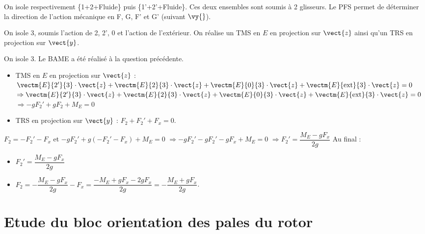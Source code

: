 \ifprof
\begin{corrige}
On isole respectivement \{1+2+Fluide\} puis \{1'+2'+Fluide\}.  Ces deux ensembles sont soumis à 2 glisseurs. Le PFS permet de déterminer la direction de l'action mécanique en F, G, F' et G' (suivant $\vy{}$).

On isole 3, soumis l'action de 2, 2', 0 et l'action de l'extérieur. On réalise un TMS en $E$ en projection sur $\vect{z}$ ainsi qu'un TRS en projection sur $\vect{y}$. 
\end{corrige}
\else
\fi

\ifprof
\begin{corrige}
On isole 3. Le BAME a été réalisé à la question précédente. 

\begin{itemize}
\item TMS en $E$ en projection sur $\vect{z}$ :
$\vectm{E}{2'}{3} \cdot \vect{z} + \vectm{E}{2}{3} \cdot \vect{z}+ \vectm{E}{0}{3} \cdot \vect{z}+ \vectm{E}{\text{ext}}{3} \cdot \vect{z} = 0$
$\Rightarrow \vectm{E}{2'}{3} \cdot \vect{z} + \vectm{E}{2}{3} \cdot \vect{z}+ \vectm{E}{0}{3} \cdot \vect{z}+ \vectm{E}{\text{ext}}{3} \cdot \vect{z} = 0$
$\Rightarrow -gF_2'+gF_2+ M_E = 0$
\item TRS en projection sur $\vect{y}$ : $F_2+F_2'+ F_x = 0$.
\end{itemize}

$F_2 = -F_2'- F_x $ et $-gF_2'+g\left( -F_2'- F_x \right)+ M_E = 0$ 
$ \Rightarrow -gF_2'-gF_2'-g F_x + M_E = 0$ 
$ \Rightarrow F_2' =\dfrac{M_E  -g F_x}{2g}$ 
Au final :
\begin{itemize}
\item $  F_2' =\dfrac{M_E  -g F_x}{2g}$ 
\item $F_2 = -\dfrac{M_E  -g F_x}{2g}- F_x =\dfrac{-M_E  +g F_x- 2gF_x}{2g}=-\dfrac{M_E  +g F_x}{2g}$.
\end{itemize}

\end{corrige}
\else
\fi


\section{Etude du bloc orientation des pales du rotor}

